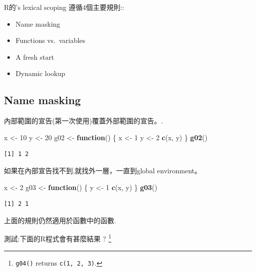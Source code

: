 \documentclass[]{book}
\newenvironment{Shaded}{\begin{snugshade}}{\end{snugshade}}
\newcommand{\ControlFlowTok}[1]{\textcolor[rgb]{0.13,0.29,0.53}{\textbf{#1}}}
\newcommand{\DecValTok}[1]{\textcolor[rgb]{0.00,0.00,0.81}{#1}}
\newcommand{\KeywordTok}[1]{\textcolor[rgb]{0.13,0.29,0.53}{\textbf{#1}}}
\newcommand{\NormalTok}[1]{#1}
\newcommand{\StringTok}[1]{\textcolor[rgb]{0.31,0.60,0.02}{#1}}
\providecommand{\tightlist}{%
  \setlength{\itemsep}{0pt}\setlength{\parskip}{0pt}}
\let\rmarkdownfootnote\footnote%
\def\footnote{\protect\rmarkdownfootnote}
\theoremstyle{definition}
\theoremstyle{definition}
\theoremstyle{definition}
\theoremstyle{remark}
\begin{document}
R的's lexical scoping 遵循4個主要規則::

\begin{itemize}
\tightlist
\item
  Name masking
\item
  Functions vs.~variables
\item
  A fresh start
\item
  Dynamic lookup
\end{itemize}

\hypertarget{name-masking}{%
\subsection{Name masking}\label{name-masking}}

內部範圍的宣告(第一次使用)覆蓋外部範圍的宣告。.

\begin{Shaded}
\begin{Highlighting}[]
\NormalTok{x <-}\StringTok{ }\DecValTok{10}
\NormalTok{y <-}\StringTok{ }\DecValTok{20}
\NormalTok{g02 <-}\StringTok{ }\ControlFlowTok{function}\NormalTok{() \{}
\NormalTok{  x <-}\StringTok{ }\DecValTok{1}
\NormalTok{  y <-}\StringTok{ }\DecValTok{2}
  \KeywordTok{c}\NormalTok{(x, y)}
\NormalTok{\}}
\KeywordTok{g02}\NormalTok{()}
\end{Highlighting}
\end{Shaded}

\begin{verbatim}
[1] 1 2
\end{verbatim}

如果在內部宣告找不到,就找外一層，一直到global environment。

\begin{Shaded}
\begin{Highlighting}[]
\NormalTok{x <-}\StringTok{ }\DecValTok{2}
\NormalTok{g03 <-}\StringTok{ }\ControlFlowTok{function}\NormalTok{() \{}
\NormalTok{  y <-}\StringTok{ }\DecValTok{1}
  \KeywordTok{c}\NormalTok{(x, y)}
\NormalTok{\}}
\KeywordTok{g03}\NormalTok{()}
\end{Highlighting}
\end{Shaded}

\begin{verbatim}
[1] 2 1
\end{verbatim}

上面的規則仍然適用於函數中的函數.

測試:下面的R程式會有甚麼結果 ? \footnote{\texttt{g04()} returns
  \texttt{c(1,\ 2,\ 3)}.}
\end{document}
